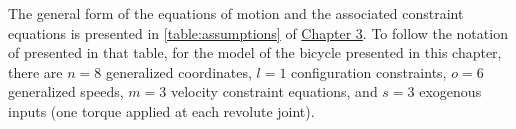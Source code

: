 The general form of the equations of motion and the associated constraint
equations is presented in \autoref{table:assumptions} of
\hyperref[chapter3]{Chapter 3}. To follow the notation of presented in that
table, for the model of the bicycle presented in this chapter, there are $n=8$
generalized coordinates, $l=1$ configuration constraints, $o=6$ generalized
speeds, $m=3$ velocity constraint equations, and $s=3$ exogenous inputs (one
torque applied at each revolute joint).


